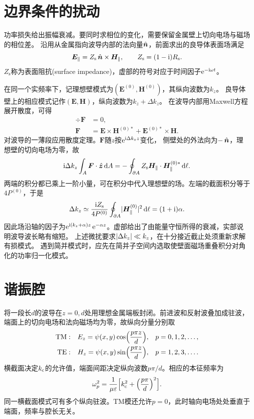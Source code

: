 \section{边界条件的扰动}
功率损失给出振幅衰减。要同时求相位的变化，需要保留金属壁上切向电场与磁场的相位差。
沿用从金属指向波导内部的法向量$\mathop{}\!\hat{\bm{n}}$，前面求出的良导体表面场满足
\begin{equation}
    \bm E_\parallel = Z_{\mathrm s}\mathop{}\!\hat{\bm{n}} \times \bm H_\parallel,
    \qquad Z_{\mathrm s} = (1 - \mathrm{i})R_{\mathrm s}.
\end{equation}
$Z_{\mathrm s}$称为表面阻抗(surface impedance)，虚部的符号对应于时间因子$\mathop{}\!\mathrm{e}^{-\mathrm{i}\omega t}$。

在同一个实频率下，记理想壁模式为$(\bm E^{(0)},\bm H^{(0)})$，其纵向波数为$k_z$。
良导体壁上的相应模式记作$(\bm E,\bm H)$，纵向波数为$k_z + \Delta k_z$。
在波导内部用Maxwell方程展开散度，可得
\begin{align*}
    \div\bm F &= 0,\\
    \bm F &= \bm E \times \bm H^{(0)\ast} + \bm E^{(0)\ast} \times \bm H .
\end{align*}
对波导的一薄段应用散度定理。$\bm F$随$z$按$\mathop{}\!\mathrm{e}^{\mathrm{i}\Delta k_z z}$变化，
侧壁处的外法向为$-\mathop{}\!\hat{\bm{n}}$，理想壁的切向电场为零，故
\[
    \mathrm{i}\Delta k_z\int_A\bm F \cdot \mathop{}\!\hat{\bm{z}}\mathop{}\!\mathrm{d} A
    = -\oint_{\partial A}Z_{\mathrm s}\bm H_\parallel \cdot \bm H^{(0)\ast}_\parallel\mathop{}\!\mathrm{d}\ell .
\]
两端的积分都已乘上一阶小量，可在积分中代入理想壁的场。左端的截面积分等于$4P^{(0)}$，于是
\begin{equation}
    \Delta k_z \simeq \frac{\mathrm{i} Z_{\mathrm s}}{4P^{(0)}}
        \oint_{\partial A}\lvert\bm H^{(0)}_\parallel\rvert^2\mathop{}\!\mathrm{d}\ell = (1 + \mathrm{i})\alpha .
\end{equation}
因此场沿轴的因子为$\mathop{}\!\mathrm{e}^{\mathrm{i}(k_z+\alpha)z}\mathop{}\!\mathrm{e}^{-\alpha z}$。虚部给出了由能量守恒所得的衰减，实部说明波导波长略有缩短。
上述微扰要求$\lvert\Delta k_z\rvert \ll k_z$，在十分接近截止处须重新求解有损模式。
遇到简并模式时，应先在简并子空间内选取使壁面磁场重叠积分对角化的功率归一化模式。

\section{谐振腔}
将一段长$d$的波导在$z = 0,d$处用理想金属端板封闭。前进波和反射波叠加成驻波，
端面上的切向电场和法向磁场均为零，故纵向分量分别取
\begin{align*}
    \mathrm{TM}&:&E_z = \psi(x,y)\cos\Bigl(\frac{p\pi z}d\Bigr),&&p &= 0,1,2,\ldots,\\
    \mathrm{TE}&:&H_z = \psi(x,y)\sin\Bigl(\frac{p\pi z}d\Bigr),&&p &= 1,2,3,\ldots.
\end{align*}
横截面决定$k_\mathrm c$的允许值，端面间距决定纵向波数$p\pi/d$。相应的本征频率为
\begin{equation}
    \omega_p^2 = \frac1{\mu\varepsilon}\Bigl[k_\mathrm c^2 + \Bigl(\frac{p\pi}d\Bigr)^2\Bigr].
\end{equation}
同一横截面模式可有多个纵向驻波。TM模还允许$p = 0$，此时轴向电场处处垂直于端面，频率与腔长无关。

